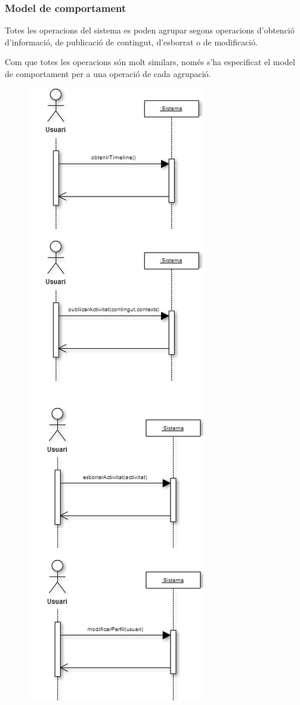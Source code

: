 
\subsubsection{Model de comportament}

Totes les operacions del sistema es poden agrupar segons operacions d'obtenció d'informació, de publicació de contingut, d'esborrat o de modificació. 

Com que totes les operacions són molt similars, només s'ha especificat el model de comportament per a una operació de cada agrupació. 


\begin{figure}[ht]
    \begin{minipage}[t]{.48\textwidth}
        \centering
        \includegraphics*[scale=0.7,viewport=0 855 322 1123]{Memoria/Especificacio/model_comportament.png}

\end{minipage}
\end{figure}
